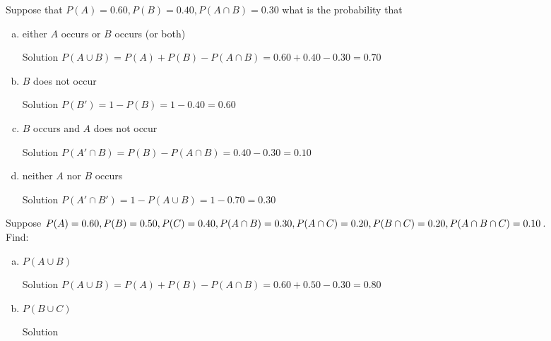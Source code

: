 \documentclass{article}
\begin{document}
\begin{spacing}{1.1}
\maketitle
\newpage
\begin{homeworkProblem}
	Suppose that $P(A) = 0.60, P(B) = 0.40, P(A \cap B) = 0.30$ what is the probability that
	
	\begin{enumerate}[(a)]
	\item either $A$ occurs or $B$ occurs (or both)
		\begin{homeworkSection}{Solution}
			$P(A \cup B) = P(A) + P(B) - P(A\cap B) = 0.60 + 0.40 - 0.30 = 0.70$ 
		\end{homeworkSection}
	\item $B$ does not occur
		\begin{homeworkSection}{Solution}
			$P(B') = 1 - P(B) = 1 - 0.40 = 0.60$
		\end{homeworkSection}
	\item $B$ occurs and $A$ does not occur
		\begin{homeworkSection}{Solution}
			$P(A' \cap B) = P(B) - P(A \cap B) = 0.40 - 0.30 =  0.10$
		\end{homeworkSection}
	\item neither $A$ nor $B$ occurs
		\begin{homeworkSection}{Solution}
			$P(A' \cap B') = 1 - P( A \cup B) = 1 - 0.70 = 0.30$
		\end{homeworkSection}	
	\end{enumerate}
\end{homeworkProblem}
\begin{homeworkProblem}
	Suppose $P( A) = 0.60, P( B) = 0.50, P( C) = 0.40, P( A \cap B) = 0.30, P( A \cap C) = 0.20, 
	\\P( B \cap C) = 0.20, P( A \cap B \cap C) = 0.10$.  
	\\Find: 
	\begin{enumerate}[(a)]
	\item $P( A \cup B)$
		\begin{homeworkSection}{Solution}
			$P( A \cup B) = P( A) + P( B) - P( A \cap B) = 0.60 + 0.50 - 0.30 = 0.80$
		\end{homeworkSection}
	\item $P( B \cup C)$
		\begin{homeworkSection}{Solution}

\end{homeworkSection}
\end{enumerate}
\end{homeworkProblem}
\end{spacing}
\end{document}
